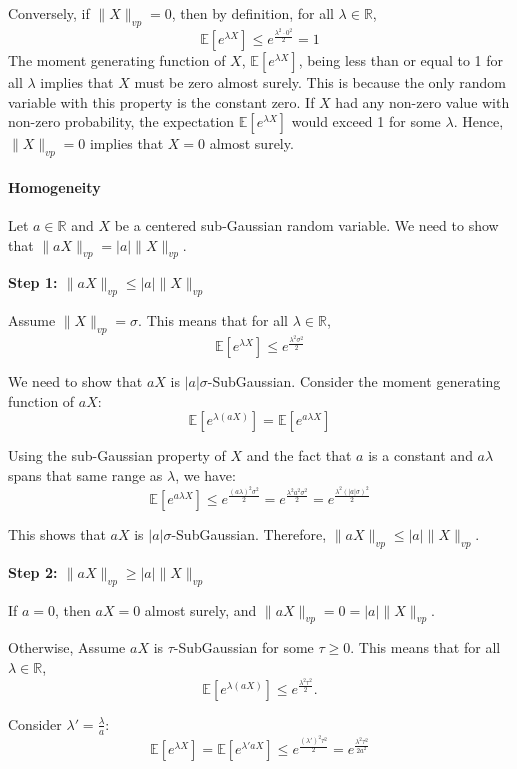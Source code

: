 \documentclass[a4 paper]{article}
\theoremstyle{boldStyle}
\theoremstyle{boldBlueStyle}
\theoremstyle{boldPurpleStyle}
\theoremstyle{boldRedStyle}
\begin{document}
\begin{enumerate}
Conversely, if \(\|X\|_{vp} = 0\), then by definition, for all \(\lambda \in \mathbb{R}\),
\[
\mathbb{E}\left[e^{\lambda X}\right] \leq e^{\frac{\lambda^2 \cdot 0^2}{2}} = 1
\]
The moment generating function of \(X\), \(\mathbb{E}\left[e^{\lambda X}\right]\), being less than or equal to 1 for all \(\lambda\) implies that \(X\) must be zero almost surely. This is because the only random variable with this property is the constant zero. If \(X\) had any non-zero value with non-zero probability, the expectation \(\mathbb{E}\left[e^{\lambda X}\right]\) would exceed 1 for some \(\lambda\). Hence, \(\|X\|_{vp} = 0\) implies that \(X = 0\) almost surely.




\paragraph{Homogeneity}
Let \(a \in \mathbb{R}\) and \(X\) be a centered sub-Gaussian random variable. We need to show that \(\|aX\|_{vp} = |a| \|X\|_{vp}\).

\textbf{Step 1: \(\|aX\|_{vp} \leq |a| \|X\|_{vp}\)}

Assume \(\|X\|_{vp} = \sigma\). This means that for all \(\lambda \in \mathbb{R}\),
\[
\mathbb{E}\left[e^{\lambda X}\right] \leq e^{\frac{\lambda^2 \sigma^2}{2}}
\]

We need to show that \(aX\) is \(|a|\sigma\)-SubGaussian. Consider the moment generating function of \(aX\):
\[
\mathbb{E}\left[e^{\lambda (aX)}\right] = \mathbb{E}\left[e^{a\lambda X}\right]
\]

Using the sub-Gaussian property of \(X\) and the fact that \(a\) is a constant and $a\lambda$ spans that same range as $\lambda$, we have:
\[
\mathbb{E}\left[e^{a\lambda X}\right] \leq e^{\frac{(a\lambda)^2 \sigma^2}{2}} = e^{\frac{\lambda^2 a^2 \sigma^2}{2}} = e^{\frac{\lambda^2 (|a|\sigma)^2}{2}}
\]

This shows that \(aX\) is \(|a|\sigma\)-SubGaussian. Therefore, $\|aX\|_{vp} \leq |a| \|X\|_{vp}$. 

\textbf{Step 2: \(\|aX\|_{vp} \geq |a| \|X\|_{vp}\)}

If $a = 0$, then $aX = 0$ almost surely, and $\|aX\|_{vp} = 0 = |a| \|X\|_{vp}$.

Otherwise, Assume \(aX\) is \(\tau\)-SubGaussian for some \(\tau \geq 0\). This means that for all \(\lambda \in \mathbb{R}\),
\[
\mathbb{E}\left[e^{\lambda (aX)}\right] \leq e^{\frac{\lambda^2 \tau^2}{2}}.
\]

Consider \(\lambda' = \frac{\lambda}{a}\):
\[
\mathbb{E}\left[e^{\lambda X}\right] = \mathbb{E}\left[e^{\lambda' aX}\right] \leq e^{\frac{(\lambda')^2 \tau^2}{2}} = e^{\frac{\lambda^2 \tau^2}{2a^2}}
\]


\end{enumerate}
\end{document}
